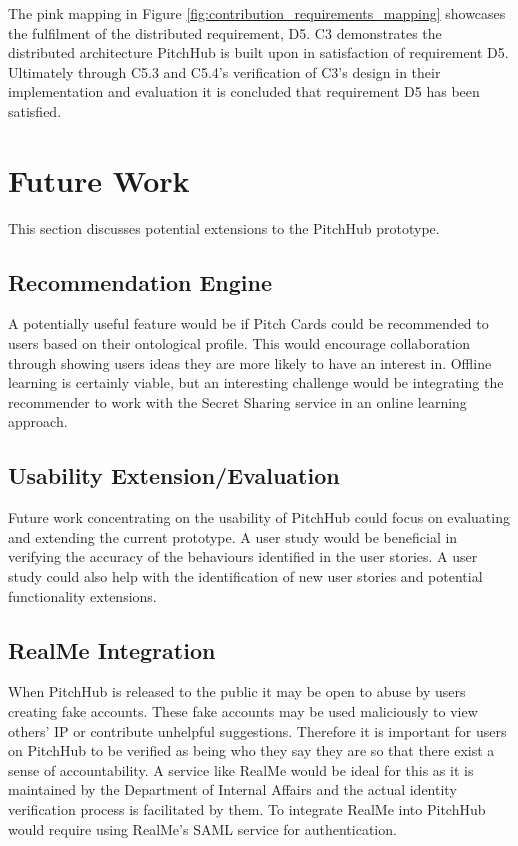 The pink mapping in Figure \ref{fig:contribution_requirements_mapping} showcases the fulfilment of the distributed requirement, D5. C3 demonstrates the distributed architecture PitchHub is built upon in satisfaction of requirement D5. Ultimately through C5.3 and C5.4's verification of C3's design in their implementation and evaluation it is concluded that requirement D5 has been satisfied.

\section{Future Work}

This section discusses potential extensions to the PitchHub prototype.

\subsection{Recommendation Engine}

A potentially useful feature would be if Pitch Cards could be recommended to users based on their ontological profile. This would encourage collaboration through showing users ideas they are more likely to have an interest in. Offline learning is certainly viable, but an interesting challenge would be integrating the recommender to work with the Secret Sharing service in an online learning approach.

\subsection{Usability Extension/Evaluation}

Future work concentrating on the usability of PitchHub could focus on evaluating and extending the current prototype. A user study would be beneficial in verifying the accuracy of the behaviours identified in the user stories. A user study could also help with the identification of new user stories and potential functionality extensions. 

\subsection{RealMe Integration}

When PitchHub is released to the public it may be open to abuse by users creating fake accounts. These fake accounts may be used maliciously to view others' IP or contribute unhelpful suggestions. Therefore it is important for users on PitchHub to be verified as being who they say they are so that there exist a sense of accountability. A service like RealMe \cite{Realme:online} would be ideal for this as it is maintained by the Department of Internal Affairs and the actual identity verification process is facilitated by them. To integrate RealMe into PitchHub would require using RealMe's SAML service for authentication.

